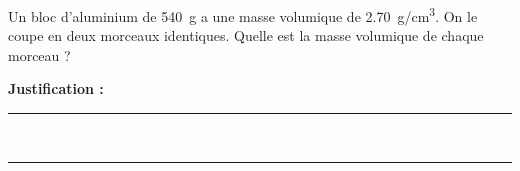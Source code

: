 Un bloc d'aluminium de \qty{540}{g} a une masse volumique de \qty{2.70}{g/cm^3}. On le coupe en deux morceaux identiques. Quelle est la masse volumique de chaque morceau ?

\choices

\noindent\textbf{Justification :} \hrulefill \\[2.5ex]
\rule{\linewidth}{0.4pt} \\[2.5ex]
\rule{\linewidth}{0.4pt}
\vfill
